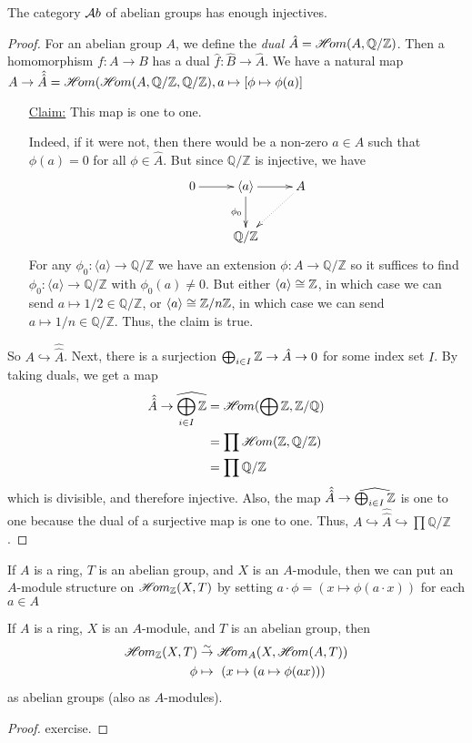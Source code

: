 \begin{lemma}
The category $\mathcal{A}b$ of abelian groups has enough injectives.
\end{lemma}
\begin{proof}
For an abelian group $A$, we define the \emph{dual} $\hat
A=\mathscr{H}\!om(A,\mathbb{Q/Z})$.  Then a homomorphism $f:A\to B$ has a
dual $\hat f: \hat B\to \hat A$.  We have a natural map $A\to
\hat{\hat A}= \mathscr{H}\!om(\mathscr{H}\!om(A,\mathbb{Q/Z},\mathbb{Q/Z}), a\mapsto
[\phi\mapsto \phi(a)]$
\begin{itemize}
\item[\underline{Claim:}] This map is one to one.

\noindent Indeed, if it were not, then there would be a non-zero
$a\in A$ such that $\phi(a)=0$ for all $\phi \in \hat A$.  But
since $\mathbb{Q/Z}$ is injective, we have
\[\xymatrix{
 0\ar[r] & \langle a \rangle \ar[r] \ar[d]_{\phi_0} & A\ar@{.>}[dl]\\
 & \mathbb{Q/Z}
}\] For any $\phi_0:\langle a \rangle \to \mathbb{Q/Z}$ we have an
extension $\phi: A\to \mathbb{Q/Z}$ so it suffices to find
$\phi_0:\langle a \rangle \to \mathbb{Q/Z}$ with
$\phi_0(a)\not=0$.  But either $\langle a \rangle \cong \mathbb{Z}$, in
which case we can send $a\mapsto 1/2 \in \mathbb{Q/Z}$, or
$\langle a \rangle \cong \mathbb{Z}/n\mathbb{Z}$, in which case we can send
$a\mapsto 1/n\in \mathbb{Q/Z}$.  Thus, the claim is true.
\end{itemize}
So $A\hookrightarrow \hat{\hat A}$.  Next, there is a surjection
$\bigoplus_{i\in I} \mathbb{Z} \to \hat A \to 0$ for some index set $I$.
By taking duals, we get a map
 \begin{align*}
 \hat{\hat A} \to \widehat{\bigoplus_{i\in I}\mathbb{Z}} &= \mathscr{H}\!om(\bigoplus \mathbb{Z},
 \mathbb{Z/Q})\\
 &= \prod \mathscr{H}\!om(\mathbb{Z},\mathbb{Q/Z})\\
 &= \prod \mathbb{Q/Z}
 \end{align*}
 which is divisible, and therefore injective.  Also, the map $\hat{\hat A} \to
 \widehat{\bigoplus_{i\in I}\mathbb{Z}}$ is one to one because the dual of
 a surjective map is one to one.  Thus, $A\hookrightarrow
 \hat{\hat A} \hookrightarrow \prod \mathbb{Q/Z}$.
\end{proof}

If $A$ is a ring, $T$ is an abelian group, and $X$ is an
$A$-module, then we can put an $A$-module structure on
$\mathscr{H}\!om_{\mathbb{Z}}(X,T)$ by setting $a\cdot \phi = (x\mapsto \phi(a\cdot
x))$ for each $a\in A$

\begin{lemma}
If $A$ is a ring, $X$ is an $A$-module, and $T$ is an abelian
group, then
\begin{align*}
\mathscr{H}\!om_{\mathbb{Z}}(X,T) & \stackrel{\sim}{\rightarrow}
\mathscr{H}\!om_A(X,\mathscr{H}\!om(A,T))\\
\phi &\mapsto \ (x\mapsto (a\mapsto \phi(ax)))
\end{align*}
as abelian groups (also as $A$-modules).
\end{lemma}
\begin{proof}
exercise.
\end{proof}

